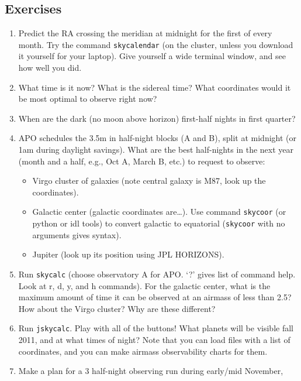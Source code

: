 \documentclass[12pt]{article}
\begin{document}
\subsection*{Exercises}
\begin{enumerate}[1.]
    \item Predict the RA crossing the meridian at midnight for the
        first of every month.
        Try the command \texttt{skycalendar} (on the cluster, unless you
        download it yourself for your laptop).
        Give yourself a wide terminal window, and
        see how well you did.
    \item What time is it now? What is the sidereal time? What coordinates would
        it be most optimal to observe right now?
    \item When are the dark (no moon above horizon) first-half nights in first
        quarter?
    \item APO schedules the 3.5m in half-night blocks (A and B), split at midnight
        (or 1am during daylight savings). What are the best half-nights in the next
        year (month and a half, e.g., Oct A, March B, etc.) to request to observe:
        \begin{itemize}
            \item Virgo cluster of galaxies (note central galaxy is M87,
                look up the coordinates).
            \item Galactic center (galactic coordinates are\ldots). Use command
                \texttt{skycoor} (or python or idl tools)
                to convert galactic to equatorial
                (\texttt{skycoor} with no arguments gives syntax).
            \item Jupiter (look up its position using JPL HORIZONS).
        \end{itemize}
    \item Run \texttt{skycalc} (choose observatory A for APO.
        `?' gives list of command
        help. Look at r, d, y, and h commands). For the galactic center, what is
        the maximum amount of time it can be observed at an airmass of less than
        2.5? How about the Virgo cluster? Why are these different?
    \item Run \texttt{jskycalc}. Play with all of the buttons! What planets will be
        visible fall 2011, and at what times of night? Note that you can load
        files with a list of coordinates, and you can make airmass observability
        charts for them.
    \item Make a plan for a 3 half-night observing run during early/mid November,

\end{enumerate}
\end{document}

